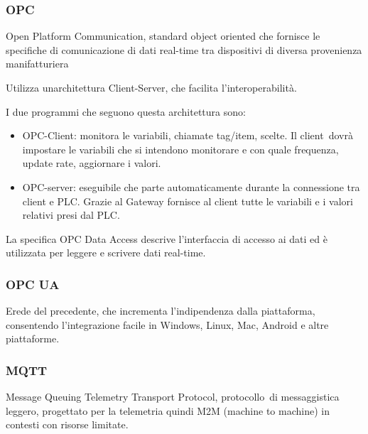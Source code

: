 \documentclass[
]{article}
\providecommand{\tightlist}{%
  \setlength{\itemsep}{0pt}\setlength{\parskip}{0pt}}
\begin{document}
\subsubsection{\texorpdfstring{{OPC}}{OPC}}\label{h.5cmksbwwcpi7}

{Open Platform Communication, standard object oriented che fornisce le
specifiche di comunicazione di dati real-time tra dispositivi di diversa
provenienza manifatturiera}

{}

{Utilizza un\textquotesingle architettura Client-Server, che facilita
l'interoperabilità.}

{I due programmi che seguono questa architettura sono:}

\begin{itemize}
\tightlist
\item
  {OPC-Client: monitora le variabili, chiamate tag/item, scelte. Il
  }{client}{~dovrà impostare le variabili che si intendono monitorare e
  con quale frequenza, update rate, aggiornare i valori.}
\end{itemize}

{}

\begin{itemize}
\tightlist
\item
  {OPC-server: eseguibile che parte automaticamente durante la
  connessione tra client e PLC. Grazie al Gateway fornisce al client
  tutte le variabili e i valori relativi presi dal PLC.}
\end{itemize}

{}

{La specifica OPC Data Access descrive l'interfaccia di accesso ai dati
ed è utilizzata per leggere e scrivere dati real-time.}

\subsubsection{\texorpdfstring{{OPC UA}}{OPC UA}}\label{h.e5tgi6jxlcjc}

{Erede del precedente, che incrementa l'indipendenza dalla piattaforma,
consentendo l'integrazione facile in Windows, Linux, Mac, Android e
altre piattaforme.}

\subsubsection{\texorpdfstring{{MQTT}}{MQTT}}\label{h.uuuqosx1bmc5}

{Message Queuing Telemetry Transport Protocol, }{protocollo}{~di
messaggistica leggero, progettato per la telemetria quindi M2M (machine
to machine) in contesti con risorse limitate.}
\end{document}
